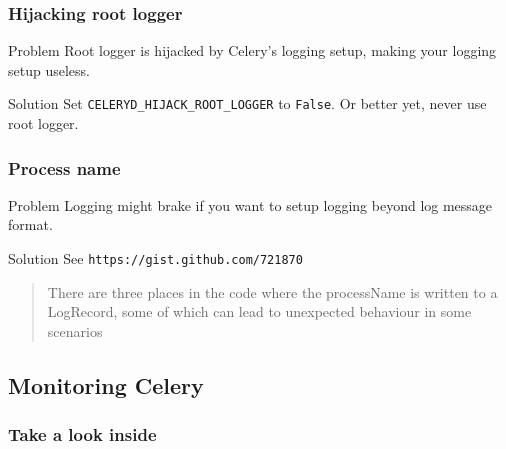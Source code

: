 \documentclass{beamer}
\begin{document}
\begin{frame}
  \frametitle{Hijacking root logger}
  \begin{block}{Problem}
    Root logger is hijacked by Celery's logging setup, making your logging
    setup useless.
  \end{block}
  \begin{block}{Solution}
    Set \texttt{CELERYD\_HIJACK\_ROOT\_LOGGER} to \texttt{False}. Or better
    yet, never use root logger.
  \end{block}
\end{frame}

\begin{frame}
  \frametitle{Process name}
  \begin{block}{Problem}
    Logging might brake if you want to setup logging beyond log message
    format.
  \end{block}
  \begin{block}{Solution}
    See \texttt{https://gist.github.com/721870}
    \begin{quotation}
      There are three places in the code where the processName is written to a
      LogRecord, some of which can lead to unexpected behaviour in some scenarios
  \end{quotation}
  \end{block}
\end{frame}

\subsection{Monitoring Celery}


\begin{frame}
  \frametitle{Take a look inside}
\end{frame}
\end{document}
